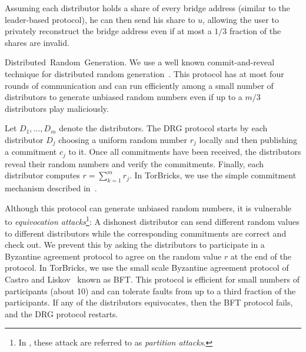 \documentclass{sig-alternate-05-2015}
\newcommand{\bricks}{}
\def\bricks/{\mbox{TorBricks}}
\newcommand{\sfsize}{\fontsize{0.8\baselineskip}{0.68\baselineskip}\selectfont}
\newcommand{\sans}[1]{\textsf{\sfsize \mbox{#1}}}
\newcommand{\para}[1]{\vspace{0.55em} \noindent \sans{{\mbox{#1}}}}
\begin{document}
Assuming each distributor holds a share of every bridge address (similar to the leader-based protocol), he can then send his share to $u$, allowing the user to privately reconstruct the bridge address even if at most a $1/3$ fraction of the shares are invalid.

\para{Distributed Random Generation.} 
We use a well known commit-and-reveal technique for distributed random generation~\cite{cryptoeprint:2015:366, Tor:DRG:Proposal:2015}. This protocol has at most four rounds of communication and can run efficiently among a small number of distributors to generate unbiased random numbers even if up to a $m/3$ distributors play maliciously.

Let $D_1,...,D_m$ denote the distributors. The DRG protocol starts by each distributor $D_j$ choosing a uniform random number $r_j$ locally and then publishing a commitment $c_j$ to it. Once all commitments have been received, the distributors reveal their random numbers and verify the commitments. Finally, each distributor computes $r = \sum_{k=1}^m{r_j}$. In \bricks/, we use the simple commitment mechanism described in~\cite{Tor:DRG:Proposal:2015}.

Although this protocol can generate unbiased random numbers, it is vulnerable to \emph{equivocation attacks}\footnote{In \cite{Tor:DRG:Proposal:2015}, these attack are referred to as \emph{partition attacks}.}: A dishonest distributor can send different random values to different distributors while the corresponding commitments are correct and check out. We prevent this by asking the distributors to participate in a Byzantine agreement protocol to agree on the random value $r$ at the end of the protocol. In \bricks/, we use the small scale Byzantine agreement protocol of Castro and Liskov~\cite{CL1} known as BFT. This protocol is efficient for small numbers of participants (about 10) and can tolerate faults from up to a third fraction of the participants. If any of the distributors equivocates, then the BFT protocol fails, and the DRG protocol restarts. 
\end{document}
